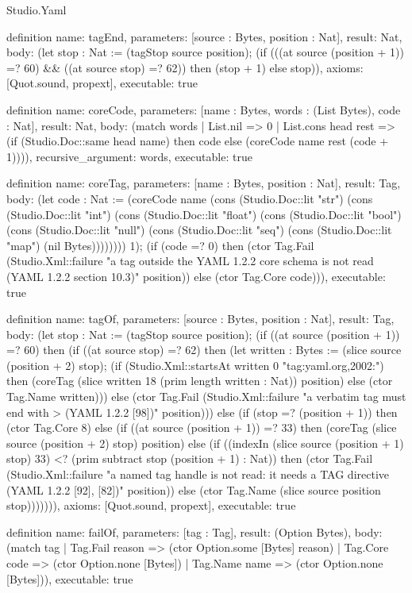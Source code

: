 \begin{lexlean}{Studio.Yaml}
\begin{semanticmodule}
definition{
  name: tagEnd,
  parameters: [source : Bytes, position : Nat],
  result: Nat,
  body: (let stop : Nat := (tagStop source position); (if (((at source (position + 1)) =? 60) && ((at source stop) =? 62)) then (stop + 1) else stop)),
  axioms: [Quot.sound, propext],
  executable: true
}

definition{
  name: coreCode,
  parameters: [name : Bytes, words : (List Bytes), code : Nat],
  result: Nat,
  body: (match words
    | List.nil => 0
    | List.cons head rest => (if (Studio.Doc::same head name) then code else (coreCode name rest (code + 1)))),
  recursive_argument: words,
  executable: true
}

definition{
  name: coreTag,
  parameters: [name : Bytes, position : Nat],
  result: Tag,
  body: (let code : Nat := (coreCode name (cons (Studio.Doc::lit "str") (cons (Studio.Doc::lit "int") (cons (Studio.Doc::lit "float") (cons (Studio.Doc::lit "bool") (cons (Studio.Doc::lit "null") (cons (Studio.Doc::lit "seq") (cons (Studio.Doc::lit "map") (nil Bytes)))))))) 1); (if (code =? 0) then (ctor Tag.Fail (Studio.Xml::failure "a tag outside the YAML 1.2.2 core schema is not read (YAML 1.2.2 section 10.3)" position)) else (ctor Tag.Core code))),
  executable: true
}

definition{
  name: tagOf,
  parameters: [source : Bytes, position : Nat],
  result: Tag,
  body: (let stop : Nat := (tagStop source position); (if ((at source (position + 1)) =? 60) then (if ((at source stop) =? 62) then (let written : Bytes := (slice source (position + 2) stop); (if (Studio.Xml::startsAt written 0 "tag:yaml.org,2002:") then (coreTag (slice written 18 (prim length written : Nat)) position) else (ctor Tag.Name written))) else (ctor Tag.Fail (Studio.Xml::failure "a verbatim tag must end with > (YAML 1.2.2 [98])" position))) else (if (stop =? (position + 1)) then (ctor Tag.Core 8) else (if ((at source (position + 1)) =? 33) then (coreTag (slice source (position + 2) stop) position) else (if ((indexIn (slice source (position + 1) stop) 33) <? (prim subtract stop (position + 1) : Nat)) then (ctor Tag.Fail (Studio.Xml::failure "a named tag handle is not read: it needs a TAG directive (YAML 1.2.2 [92], [82])" position)) else (ctor Tag.Name (slice source position stop))))))),
  axioms: [Quot.sound, propext],
  executable: true
}

definition{
  name: failOf,
  parameters: [tag : Tag],
  result: (Option Bytes),
  body: (match tag
    | Tag.Fail reason => (ctor Option.some [Bytes] reason)
    | Tag.Core code => (ctor Option.none [Bytes])
    | Tag.Name name => (ctor Option.none [Bytes])),
  executable: true
}


\end{semanticmodule}
\end{lexlean}
